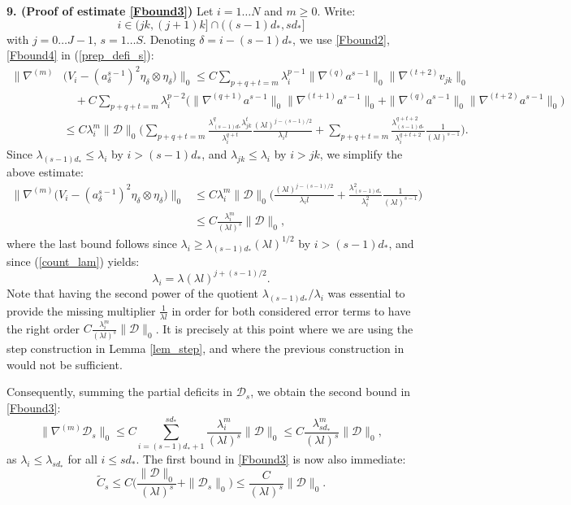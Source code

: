 \documentclass[reqno,twoside,11pt]{amsart}
\numberwithin{equation}{section}
\theoremstyle{plain}
\theoremstyle{definition}
\begin{document}
{\bf 9. (Proof of estimate \ref{Fbound3})} Let $i=1\ldots N$ and $m\geq 0$. Write: 
$$i\in (jk, (j+1)k]\cap ((s-1)d_*, sd_*]$$ 
with $j=0\ldots J-1$, $s=1\ldots S$. Denoting $\delta = i-(s-1)d_*$,
we use \ref{Fbound2}, \ref{Fbound4} in (\ref{prep_defi_s}):
\begin{equation*}
\begin{split}
\big\|\nabla^{(m)}& \big(V_i -(a_\delta^{s-1})^2\eta_\delta\otimes\eta_\delta\big)\big\|_0 \leq 
C \sum_{p+q+t=m} \lambda_i^{p-1}\|\nabla^{(q)}a^{s-1}\|_0\|\nabla^{(t+2)}v_{jk}\|_0 
\\ & \quad + C \sum_{p+q+t=m} \lambda_i^{p-2}\Big(\|\nabla^{(q+1)}a^{s-1}\|_0\|\nabla^{(t+1)}a^{s-1}\|_0 
+ \|\nabla^{(q)}a^{s-1}\|_0\|\nabla^{(t+2)}a^{s-1}\|_0 \Big) \\ & \leq
C\lambda_i^m \|\mathcal{D}\|_0 \Big(\sum_{p+q+t=m}
\frac{\lambda_{(s-1)d_*}^q \lambda_{jk}^t}{\lambda_i^{q+t}}\frac{(\lambda l)^{j-(s-1)/2}}{\lambda_i l}
+ \sum_{p+q+t=m}
\frac{\lambda_{(s-1)d_*}^{q+t+2} }{\lambda_i^{q+t+2}}\frac{1}{(\lambda  l)^{s-1}} \Big).
\end{split}
\end{equation*}
Since $\lambda_{(s-1)d_*}\leq \lambda_i$ by $i>(s-1)d_*$, and
$\lambda_{jk}\leq \lambda_i$ by $i>jk$, we simplify the above estimate:  
\begin{equation*}
\begin{split}
\big\|\nabla^{(m)}\big(V_i
-(a_\delta^{s-1})^2\eta_\delta\otimes\eta_\delta\big)\big\|_0 & \leq 
C\lambda_i^m \|\mathcal{D}\|_0 \Big(\frac{(\lambda l)^{j-(s-1)/2}}{\lambda_i l}
+  \frac{\lambda_{(s-1)d_*}^{2} }{\lambda_i^{2}}\frac{1}{(\lambda l)^{s-1}} \Big)
\\ & \leq C\frac{\lambda_i^m}{(\lambda l)^{s}} \|\mathcal{D}\|_0, 
\end{split}
\end{equation*}
where the last bound follows since $\lambda_i\geq \lambda_{(s-1)d_*}
(\lambda l)^{1/2}$ by $i>(s-1)d_*$, and since (\ref{count_lam}) yields:
$$\lambda_i = \lambda (\lambda l)^{j+(s-1)/2}.$$
Note that having the second power of the quotient
$\lambda_{(s-1)d_*}/\lambda_i$ was essential to provide the missing
multiplier $\frac{1}{\lambda l}$ in order for
both considered error terms to have  the right order $C\frac{\lambda_i^m}{(\lambda l)^{s}}
\|\mathcal{D}\|_0$. It is precisely at this point where we are using
the step construction in Lemma \ref{lem_step}, and where the
previous construction in \cite[Lemma 2.2]{lewpak_MA} would not be sufficient.

Consequently, summing the partial deficits in $\mathcal{D}_s$, we
obtain the second bound in \ref{Fbound3}:
$$\|\nabla^{(m)}\mathcal{D}_s\|_0\leq C
\sum_{i=(s-1)d_*+1}^{sd_*}\frac{\lambda_i^m}{(\lambda l)^s}
\|\mathcal{D}\|_0 \leq  C \frac{\lambda_{sd_*}^m}{(\lambda l)^{s}} \|\mathcal{D}\|_0,$$
as $\lambda_i\leq\lambda_{sd_*}$ for all $i\leq sd_*$.
The first bound in \ref{Fbound3} is now also immediate:
$$\tilde C_s \leq C\Big(\frac{\|\mathcal{D}\|_0}{(\lambda l)^s} +
\|\mathcal{D}_s\|_0\Big)\leq \frac{C}{(\lambda l)^{s}} \|\mathcal{D}\|_0.$$
\end{document}
